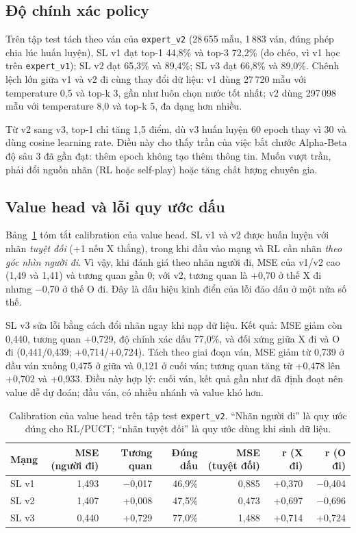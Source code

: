 \subsection{Độ chính xác policy}
Trên tập test tách theo ván của \texttt{expert\_v2} (28\,655 mẫu, 1\,883 ván, đúng phép chia lúc
huấn luyện), SL v1 đạt top-1 44,8\% và top-3 72,2\% (đo chéo, vì v1 học trên \texttt{expert\_v1}); SL
v2 đạt 65,3\% và 89,4\%; SL v3 đạt 66,8\% và 89,0\%. Chênh lệch lớn giữa v1 và v2 đi cùng thay đổi
dữ liệu: v1 dùng 27\,720 mẫu với temperature 0,5 và top-k 3, gần như luôn chọn nước tốt nhất; v2 dùng
297\,098 mẫu với temperature 8,0 và top-k 5, đa dạng hơn nhiều.

Từ v2 sang v3, top-1 chỉ tăng 1,5 điểm, dù v3 huấn luyện 60 epoch thay vì 30 và dùng cosine
learning rate. Điều này cho thấy trần của việc bắt chước Alpha-Beta độ sâu 3 đã gần đạt: thêm
epoch không tạo thêm thông tin. Muốn vượt trần, phải đổi nguồn nhãn (RL hoặc self-play) hoặc
tăng chất lượng chuyên gia.

\subsection{Value head và lỗi quy ước dấu}
Bảng~\ref{tab:tn-value} tóm tắt calibration của value head. SL v1 và v2 được huấn luyện với
nhãn \emph{tuyệt đối} (+1 nếu X thắng), trong khi đầu vào mạng và RL cần nhãn \emph{theo góc
nhìn người đi}. Vì vậy, khi đánh giá theo nhãn người đi, MSE của v1/v2 cao (1,49 và 1,41) và
tương quan gần 0; với v2, tương quan là +0,70 ở thế X đi nhưng −0,70 ở thế O đi.
Đây là dấu hiệu kinh điển của lỗi đảo dấu ở một nửa số thế.

SL v3 sửa lỗi bằng cách đổi nhãn ngay khi nạp dữ liệu. Kết quả: MSE giảm còn 0,440, tương quan
+0,729, độ chính xác dấu 77,0\%, và đối xứng giữa X đi và O đi (0,441/0,439; +0,714/+0,724).
Tách theo giai đoạn ván, MSE giảm từ 0,739 ở đầu ván xuống 0,475 ở giữa và 0,121 ở cuối ván;
tương quan tăng từ +0,478 lên +0,702 và +0,933. Điều này hợp lý: cuối ván, kết quả gần như đã
định đoạt nên value dễ dự đoán; đầu ván, có nhiều nhánh và value khó hơn.

\begin{table}[H]
  \centering\small
  \caption{Calibration của value head trên tập test \texttt{expert\_v2}. ``Nhãn người đi'' là
  quy ước đúng cho RL/PUCT; ``nhãn tuyệt đối'' là quy ước dùng khi sinh dữ liệu.}
  \label{tab:tn-value}
  \begin{tabular}{@{}lrrrrrr@{}}
    \toprule
    \textbf{Mạng} & \textbf{MSE (người đi)} & \textbf{Tương quan} & \textbf{Đúng dấu} &
    \textbf{MSE (tuyệt đối)} & \textbf{r (X đi)} & \textbf{r (O đi)} \\
    \midrule
    SL v1 & 1,493 & −0,017 & 46,9\% & 0,885 & +0,370 & −0,404 \\
    SL v2 & 1,407 & +0,008 & 47,5\% & 0,473 & +0,697 & −0,696 \\
    SL v3 & 0,440 & +0,729 & 77,0\% & 1,488 & +0,714 & +0,724 \\
    \bottomrule
  \end{tabular}
\end{table}

